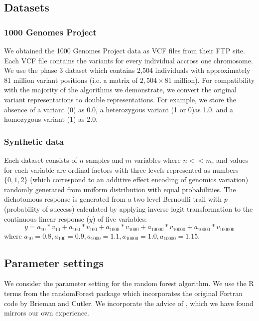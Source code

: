 \documentclass[10pt,letterpaper]{article}
\begin{document}
\subsection{Datasets}
\subsubsection{1000 Genomes Project}
We obtained the 1000 Genomes Project data as VCF files from their FTP site.  Each VCF file contains the variants for every individual accross one chromosome.  
We use the phase 3 dataset which contains 2,504 individuals with approximately 81 million variant positions (i.e. a matrix of $2,504 \times 81$ million).  
For compatibility with the majority of the algorithms we demonstrate, we convert the original variant representations to double representations.  
For example, we store the absence of a variant (0) as 0.0, a heterozygous variant (1 or 0)as 1.0. and a homozygous variant (1) as 2.0.

\subsubsection{Synthetic data} 
Each dataset consists of $n$ samples and $m$ variables where $n << m$, and values for each variable are ordinal factors with
three levels represented as numbers $\{0, 1, 2\}$ (which correspond to an additive effect encoding of genomics variation) randomly
generated from uniform distribution with equal probabilities.  The dichotomous response is generated from a two level
Bernoulli trail with $p$ (probability of success) calculated by applying inverse logit transformation to the continuous
linear response ($y$) of five variables:
$$y = a_{10}* v_{10} + a_{100}*v_{100} + a_{1000}*v_{1000} + a_{10000}*v_{10000} + a_{10000}*v_{100000}$$
where $a_{10} = 0.8, a_{100} = 0.9, a_{1000} = 1.1, a_{10000} = 1.0, a_{10000}=1.15$.



\subsection{Parameter settings}
We consider the parameter setting for the random forest algorithm. We use the R terms from the {\sc randomForest} package
\cite{Liaw.and.Weiner.2002} which incorporates the original Fortran code by Brieman and Cutler.  We incorporate the
advice of \cite{Liaw.and.Weiner.2002}, which we have found mirrors our own experience.
\end{document}
